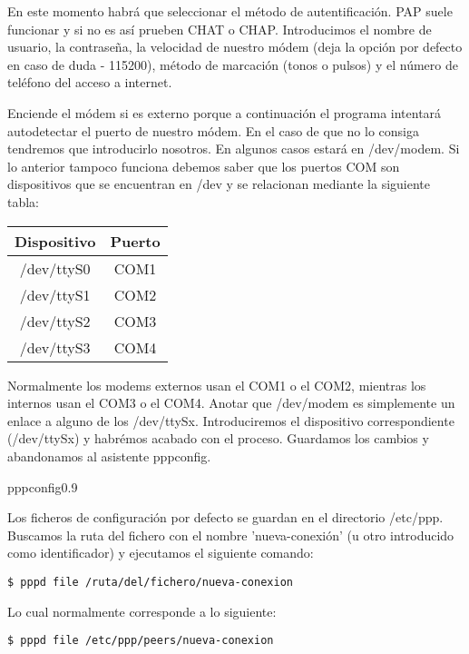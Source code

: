 En este  momento habrá que  seleccionar el método  de autentificación.
PAP suele funcionar  y si no es así prueben  CHAT o CHAP. Introducimos
el nombre  de usuario,  la contraseña, la  velocidad de  nuestro módem
(deja  la opción  por defecto  en caso  de duda  - 115200),  método de
marcación  (tonos o  pulsos)  y el  número de  teléfono  del acceso  a
internet.

Enciende  el módem  si es  externo porque  a continuación  el programa
intentará autodetectar el  puerto de nuestro módem. En el  caso de que
no lo  consiga tendremos que  introducirlo nosotros. En  algunos casos
estará en  /dev/modem. Si lo  anterior tampoco funciona  debemos saber
que los  puertos COM son dispositivos  que se encuentran en  /dev y se
relacionan mediante la siguiente tabla:

\begin{center}
	\begin{tabular}{c|c}
	Dispositivo & Puerto \\
	\hline
	/dev/ttyS0 & COM1 \\
	/dev/ttyS1 & COM2 \\
	/dev/ttyS2 & COM3 \\
	/dev/ttyS3 & COM4 \\
	\end{tabular}
\end{center}

Normalmente los modems  externos usan el COM1 o el  COM2, mientras los
internos usan el COM3 o el  COM4. Anotar que /dev/modem es simplemente
un enlace  a alguno de  los /dev/ttySx. Introduciremos  el dispositivo
correspondiente  (/dev/ttySx)  y  habrémos  acabado  con  el  proceso.
Guardamos los cambios y abandonamos al asistente pppconfig.

\begin{figura}{pppconfig}{0.9}
\caption{PPPConfig}
\end{figura}

Los ficheros de configuración por  defecto se guardan en el directorio
/etc/ppp. Buscamos la ruta del  fichero con el nombre 'nueva-conexión'
(u  otro introducido  como  identificador) y  ejecutamos el  siguiente
comando:

\begin{verbatim}
$ pppd file /ruta/del/fichero/nueva-conexion
\end{verbatim}

Lo cual normalmente corresponde a lo siguiente:

\begin{verbatim}
$ pppd file /etc/ppp/peers/nueva-conexion
\end{verbatim}

